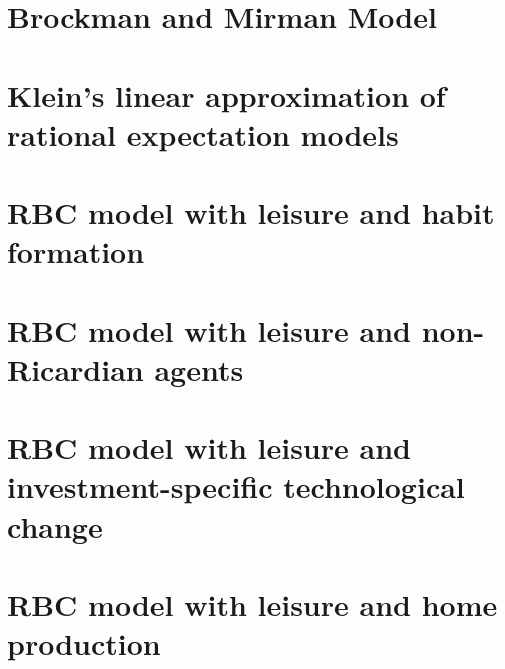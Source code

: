 \documentclass[a4paper]{scrartcl}
\newif\ifSolutEnd
\begin{document}
    \section{Brockman and Mirman Model}
    
    
    \section{Klein's linear approximation of rational expectation models}
    
    
    \section{RBC model with leisure and habit formation}
    
    
    \section{RBC model with leisure and non-Ricardian agents}
    
    
    \section{RBC model with leisure and investment-specific technological change}
    
    
    \section{RBC model with leisure and home production}
    
\fi




%     
\end{document}
